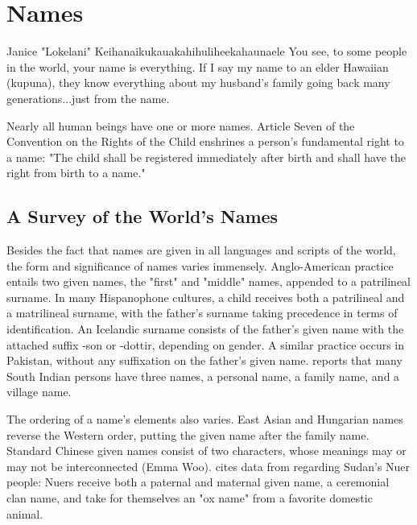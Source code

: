\section{Names}

\begin{aquote}{Janice "Lokelani" Keihanaikukauakahihuliheekahaunaele}
You see, to some people in the world, your name is everything. If I say my name
to an elder Hawaiian (kupuna), they know everything about my husband's family
going back many generations...just from the name.
\end{aquote}

Nearly all human beings have one or more names. Article Seven of the Convention on
the Rights of the Child enshrines a person's fundamental right to a name: "The
child shall be registered immediately after birth and shall have the right from
birth to a name." \parencite{crc}

\subsection{A Survey of the World's Names}

Besides the fact that names are given in all languages and scripts of the world,
the form and significance of names varies immensely. Anglo-American practice
entails two given names, the "first" and "middle" names, appended to a
patrilineal surname. In many Hispanophone cultures, a child receives both a
patrilineal and a matrilineal surname, with the father's surname taking
precedence in terms of identification. An Icelandic surname consists of the
father's given name with the attached suffix -son or -dottir, depending on
gender. A similar practice occurs in Pakistan, without any suffixation on the
father's given name. \textcite{finch08} reports that many South Indian persons
have three names, a personal name, a family name, and a village name.

The ordering of a name's elements also varies. East Asian and Hungarian names
reverse the Western order, putting the given name after the family name.
Standard Chinese given names consist of two characters, whose meanings may or
may not be interconnected (Emma Woo). \textcite{wardhaugh92} cites data from
\textcite{evanspritchard48} regarding Sudan's Nuer people: Nuers receive both a
paternal and maternal given name, a ceremonial clan name, and take for
themselves an "ox name" from a favorite domestic animal.

